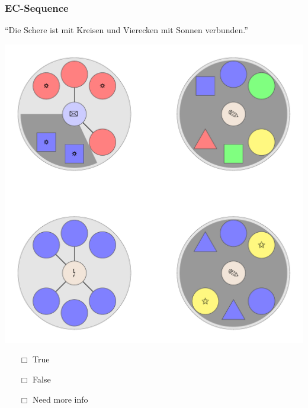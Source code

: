 \documentclass[fleqn,10pt,serif,xcolor=dvipsnames]{beamer}
\newcommand{\EC}{EC\xspace}
\newcommand{\mymark}[1]{{\color{blue}{#1}}}
\begin{document}
\begin{frame}
  \frametitle{\EC-Sequence}
  \begin{center}
    ``Die Schere ist mit Kreisen und Vierecken mit Sonnen verbunden.''

    \vspace{0.1cm}

    \includegraphics[width=0.5 \textwidth]{../../pictures/ec_01_3.pdf}

    \vspace{0.1cm}

    \begin{multicols}{3}
      \begin{itemize} 
      \item[$\Box$] True\\
        \onslide<2>{$\leadsto$  \mymark{false}}
      \item[$\Box$] False\\
        \onslide<2>{$\leadsto$ \mymark{EC}}
      \item[$\Box$] Need more info 
      \end{itemize}
    \end{multicols}

  \end{center}
\end{frame}
\end{document}
